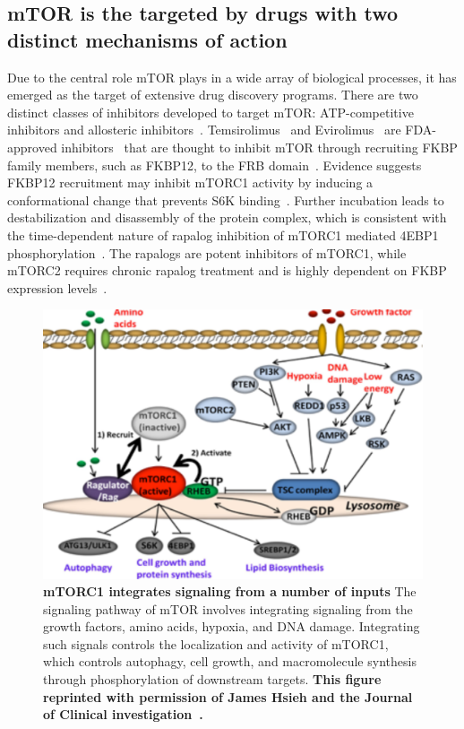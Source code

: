 \documentclass[phd,tocprelim]{cornell}
\begin{document}
\subsection{mTOR is the targeted by drugs with two distinct mechanisms of action}
Due to the central role mTOR plays in a wide array of biological processes, it has emerged as the target of extensive drug discovery programs. There are two distinct classes of inhibitors developed to target mTOR: ATP-competitive inhibitors and allosteric inhibitors~\citep{Ballou:2008ec,Lamming:2013kg}. Temsirolimus~\citep{Hudes:2007kp} and Evirolimus~\citep{Motzer:2008cn} are FDA-approved inhibitors~\citep{fda-approved-kinase-inhibitors} that are thought to inhibit mTOR through recruiting FKBP family members, such as FKBP12, to the FRB domain~\citep{Hausch:2013iu}. Evidence suggests FKBP12 recruitment may inhibit mTORC1 activity by inducing a conformational change that prevents S6K binding~\citep{Yip:2010bm}. Further incubation leads to destabilization and disassembly of the protein complex, which is consistent with the time-dependent nature of rapalog inhibition of mTORC1 mediated 4EBP1 phosphorylation~\citep{Yip:2010bm}. The rapalogs are potent inhibitors of mTORC1, while mTORC2 requires chronic rapalog treatment and is highly dependent on FKBP expression levels~\citep{Schreiber:2015fi}. 

\begin{landscape}
	\begin{figure}[p]
		\centering
		\includegraphics[width=0.8\linewidth]{figures/mtor-fig2.pdf}
		\caption[mTORC1 integrates signaling from a number of inputs]{
			{\bf mTORC1 integrates signaling from a number of inputs}
			The signaling pathway of mTOR involves integrating signaling from the growth factors, amino acids, hypoxia, and DNA damage. Integrating such signals controls the localization and activity of mTORC1, which controls autophagy, cell growth, and macromolecule synthesis through phosphorylation of downstream targets. \bf{This figure reprinted with permission of James Hsieh and the Journal of Clinical investigation~\citep{Xu:2016fw}.} 
		}
		\label{fig:mtor-figure2}
	\end{figure}
\end{landscape}
\end{document}
